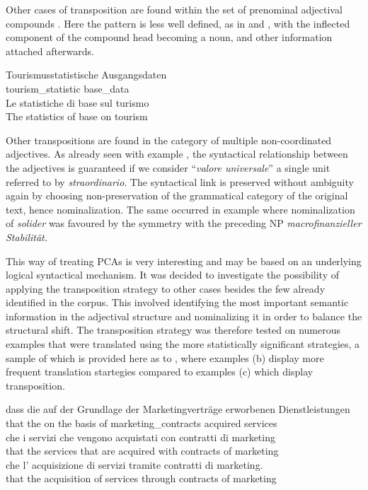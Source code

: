 \documentclass[output=paper,colorlinks,citecolor=brown]{langscibook}
\begin{document}
Other cases of transposition are found within the set of prenominal adjectival compounds . Here the pattern is less well defined, as in  and , with the inflected component of the compound head becoming a noun, and other information attached afterwards.

\ea%
    \label{ex:resi:57}
\ea
\gll Tourismusstatistische  Ausgangsdaten \\
    tourism\_statistic  base\_data \\
\ex
\gll   Le  statistiche  di  base  sul  turismo\\
  The  statistics  of  base  on  tourism\\
\z
\z

Other transpositions are found in the category of multiple non-coordinated adjectives. As already seen with example , the syntactical relationship between the adjectives is guaranteed if we consider “\textit{valore universale}” a single unit referred to by \textit{straordinario}. The syntactical link is preserved without ambiguity again by choosing non-preservation of the grammatical category of the original text, hence nominalization. The same occurred in example  where nominalization of \textit{solider} was favoured by the symmetry with the preceding NP \textit{macrofinanzieller Stabilität.}

This way of treating PCAs is very interesting and may be based on an underlying logical syntactical mechanism. It was decided to investigate the possibility of applying the transposition strategy to other cases besides the few already identified in the corpus. This involved identifying the most important semantic information in the adjectival structure and nominalizing it in order to balance the structural shift. The transposition strategy was therefore tested on numerous examples that were translated using the more statistically significant strategies, a sample of which is provided here as  to , where examples (b) display more frequent translation startegies compared to examples (c) which display transposition.

\ea%
    \label{ex:resi:58}
\ea
\gll  dass  die  auf  der  Grundlage  der  Marketingverträge  erworbenen  Dienstleistungen \\
    that  the  on  the  basis  of  marketing\_contracts  acquired  services \\
\ex
\gll  che   i  servizi  che  vengono  acquistati  con  contratti  di  marketing\\
    that   the  services  that  are  acquired  with   contracts  of  marketing\\
\ex
  \gll  che  l’  acquisizione  di  servizi  tramite  contratti  di  marketing.\\
    that  the  acquisition  of  services  through  contracts  of  marketing\\
  \z
\z
\end{document}
